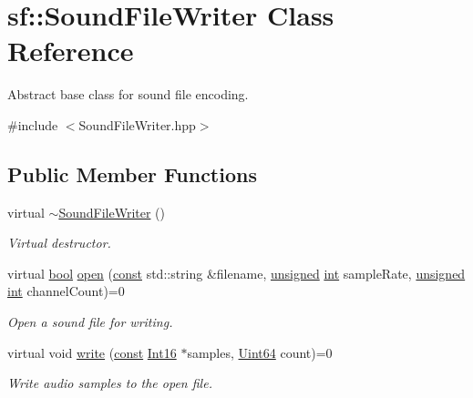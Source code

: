 \hypertarget{classsf_1_1_sound_file_writer}{\section{sf\-:\-:Sound\-File\-Writer Class Reference}
\label{classsf_1_1_sound_file_writer}
}


Abstract base class for sound file encoding.  




{\ttfamily \#include $<$Sound\-File\-Writer.\-hpp$>$}

\subsection*{Public Member Functions}
\begin{DoxyCompactItemize}
\item 
virtual \hyperlink{classsf_1_1_sound_file_writer_a76944fc158688f35050bd5b592c90270}{$\sim$\-Sound\-File\-Writer} ()
\begin{DoxyCompactList}\small\item\em Virtual destructor. \end{DoxyCompactList}\item 
virtual \hyperlink{term__entry_8h_a002004ba5d663f149f6c38064926abac}{bool} \hyperlink{classsf_1_1_sound_file_writer_a5c92bcaaa880ef4d3eaab18dae1d3d07}{open} (\hyperlink{term__entry_8h_a57bd63ce7f9a353488880e3de6692d5a}{const} std\-::string \&filename, \hyperlink{curses_8priv_8h_aca40206900cfc164654362fa8d4ad1e6}{unsigned} \hyperlink{term__entry_8h_ad65b480f8c8270356b45a9890f6499ae}{int} sample\-Rate, \hyperlink{curses_8priv_8h_aca40206900cfc164654362fa8d4ad1e6}{unsigned} \hyperlink{term__entry_8h_ad65b480f8c8270356b45a9890f6499ae}{int} channel\-Count)=0
\begin{DoxyCompactList}\small\item\em Open a sound file for writing. \end{DoxyCompactList}\item 
virtual void \hyperlink{classsf_1_1_sound_file_writer_a4ce597e7682d22c5b2c98d77e931a1da}{write} (\hyperlink{term__entry_8h_a57bd63ce7f9a353488880e3de6692d5a}{const} \hyperlink{namespacesf_a3c8e10435e2a310a7741755e66b5c94e}{Int16} $\ast$samples, \hyperlink{namespacesf_add9ac83466d96b9f50a009b9f4064266}{Uint64} count)=0
\begin{DoxyCompactList}\small\item\em Write audio samples to the open file. \end{DoxyCompactList}\item 

\end{DoxyCompactItemize}
